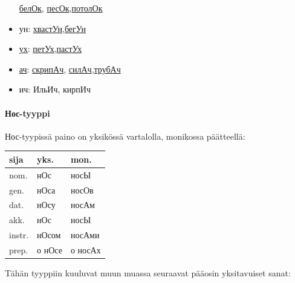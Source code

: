 \documentclass[]{scrartcl}
\begin{document}
\begin{itemize}
  \href{http://ru.wiktionary.org/wiki/\%D0\%B1\%D0\%B5\%D0\%BB\%D0\%BE\%D0\%BA}{белОк},
  \href{http://ru.wiktionary.org/wiki/\%D0\%BF\%D0\%B5\%D1\%81\%D0\%BE\%D0\%BA}{песОк},\href{http://ru.wiktionary.org/wiki/\%D0\%BF\%D0\%BE\%D1\%82\%D0\%BE\%D0\%BB\%D0\%BE\%D0\%BA}{потолОк}
\item
  ун:
  \href{http://ru.wiktionary.org/wiki/\%D1\%85\%D0\%B2\%D0\%B0\%D1\%81\%D1\%82\%D1\%83\%D0\%BD}{хвастУн},\href{http://ru.wiktionary.org/wiki/\%D0\%B1\%D0\%B5\%D0\%B3\%D1\%83\%D0\%BD}{бегУн}
\item
  \href{http://ru.wiktionary.org/wiki/\%D1\%83\%D1\%85}{ух}:
  \href{http://ru.wiktionary.org/wiki/\%D0\%BF\%D0\%B5\%D1\%82\%D1\%83\%D1\%85}{петУх},\href{http://ru.wiktionary.org/wiki/\%D0\%BF\%D0\%B0\%D1\%81\%D1\%82\%D1\%83\%D1\%85}{пастУх}
\item
  \href{http://ru.wiktionary.org/wiki/\%D0\%B0\%D1\%87}{ач}:
  \href{http://ru.wiktionary.org/wiki/\%D1\%81\%D0\%BA\%D1\%80\%D0\%B8\%D0\%BF\%D0\%B0\%D1\%87}{скрипАч},
  \href{http://ru.wiktionary.org/wiki/\%D1\%81\%D0\%B8\%D0\%BB\%D0\%B0\%D1\%87}{силАч},\href{http://ru.wiktionary.org/wiki/\%D1\%82\%D1\%80\%D1\%83\%D0\%B1\%D0\%B0\%D1\%87}{трубАч}
\item
  ич: ИльИч, кирпИч
\end{itemize}

\paragraph{Нос-tyyppi}\label{ux43dux43eux441-tyyppi}

Нос-tyypissä paino on yksikössä vartalolla, monikossa päätteellä:

\begin{longtable}[c]{@{}lll@{}}
\toprule
sija & yks. & mon.\tabularnewline
\midrule
\endhead
nom. & нОс & носЫ\tabularnewline
gen. & нОса & носОв\tabularnewline
dat. & нОсу & носАм\tabularnewline
akk. & нОс & носЫ\tabularnewline
instr. & нОсом & носАми\tabularnewline
prep. & о нОсе & о носАх\tabularnewline
\bottomrule
\end{longtable}

Tähän tyyppiin kuuluvat muun muassa seuraavat pääosin yksitavuiset
sanat:
\end{document}
